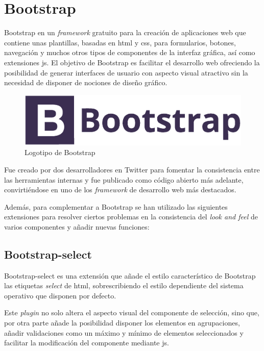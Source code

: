 \section{Bootstrap}

Bootstrap en un \textit{framework} gratuito para la creación de aplicaciones web que contiene unas plantillas, basadas en \acrshort{html} y \acrshort{css}, para formularios, botones, navegación y muchos otros tipos de componentes de la interfaz gráfica, así como extensiones \acrshort{js}. El objetivo de Bootstrap es facilitar el desarrollo web ofreciendo la posibilidad de generar interfaces de usuario con aspecto visual atractivo sin la necesidad de disponer de nociones de diseño gráfico.

\begin{figure}[!htbp]
	\centering
	\includegraphics[scale=0.45]{fig/bootstrap_logo}
	\caption{Logotipo de Bootstrap}
\end{figure}

Fue creado por dos desarrolladores en Twitter para fomentar la consistencia entre las herramientas internas y fue publicado como código abierto más adelante, convirtiéndose en uno de los \textit{framework} de desarrollo web más destacados.

Además, para complementar a Bootstrap se han utilizado las siguientes extensiones para resolver ciertos problemas en la consistencia del \textit{look and feel} de varios componentes y añadir nuevas funciones:

\subsection{Bootstrap-select}

Bootstrap-select\cite{BootstrapSelect} es una extensión que añade el estilo característico de Bootstrap las etiquetas \textit{select} de \acrshort{html}, sobrescribiendo el estilo dependiente del sistema operativo que disponen por defecto. 

Este \textit{plugin} no solo altera el aspecto visual del componente de selección, sino que, por otra parte añade la posibilidad disponer los elementos en agrupaciones, añadir validaciones como un máximo y mínimo de elementos seleccionados y facilitar la modificación del componente mediante \acrshort{js}.

